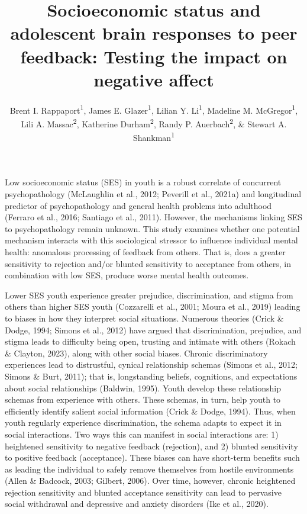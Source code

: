 \documentclass[
  man]{apa7}
\title{Socioeconomic status and adolescent brain responses to peer feedback: Testing the impact on negative affect}
\author{Brent I. Rappaport\textsuperscript{1}, James E. Glazer\textsuperscript{1}, Lilian Y. Li\textsuperscript{1}, Madeline M. McGregor\textsuperscript{1}, Lili A. Massac\textsuperscript{2}, Katherine Durham\textsuperscript{2}, Randy P. Auerbach\textsuperscript{2}, \& Stewart A. Shankman\textsuperscript{1}}
\date{}
\affiliation{\vspace{0.5cm}\textsuperscript{1} Department of Psychiatry, Feinberg School of Medicine, Northwestern University\\\textsuperscript{2} Columbia University}
\begin{document}
\maketitle

\newpage{}

Low socioeconomic status (SES) in youth is a robust correlate of concurrent psychopathology (McLaughlin et al., 2012; Peverill et al., 2021a) and longitudinal predictor of psychopathology and general health problems into adulthood (Ferraro et al., 2016; Santiago et al., 2011). However, the mechanisms linking SES to psychopathology remain unknown. This study examines whether one potential mechanism interacts with this sociological stressor to influence individual mental health: anomalous processing of feedback from others. That is, does a greater sensitivity to rejection and/or blunted sensitivity to acceptance from others, in combination with low SES, produce worse mental health outcomes.

Lower SES youth experience greater prejudice, discrimination, and stigma from others than higher SES youth (Cozzarelli et al., 2001; Moura et al., 2019) leading to biases in how they interpret social situations. Numerous theories (Crick \& Dodge, 1994; Simons et al., 2012) have argued that discrimination, prejudice, and stigma leads to difficulty being open, trusting and intimate with others (Rokach \& Clayton, 2023), along with other social biases. Chronic discriminatory experiences lead to distrustful, cynical relationship schemas (Simons et al., 2012; Simons \& Burt, 2011); that is, longstanding beliefs, cognitions, and expectations about social relationships (Baldwin, 1995). Youth develop these relationship schemas from experience with others. These schemas, in turn, help youth to efficiently identify salient social information (Crick \& Dodge, 1994). Thus, when youth regularly experience discrimination, the schema adapts to expect it in social interactions. Two ways this can manifest in social interactions are: 1) heightened sensitivity to negative feedback (rejection), and 2) blunted sensitivity to positive feedback (acceptance). These biases can have short-term benefits such as leading the individual to safely remove themselves from hostile environments (Allen \& Badcock, 2003; Gilbert, 2006). Over time, however, chronic heightened rejection sensitivity and blunted acceptance sensitivity can lead to pervasive social withdrawal and depressive and anxiety disorders (Ike et al., 2020).
\end{document}
